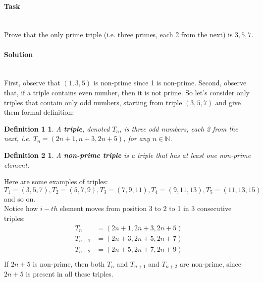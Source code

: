 \documentclass[11pt]{article}
\begin{document}
   \paragraph{Task}\mbox{} \\
   Prove that the only prime triple (i.e. three primes, each 2 from the next) is $3, 5, 7$.
   \paragraph{Solution}\mbox{} \\
   First, observe that $(1, 3, 5)$ is non-prime since 1 is non-prime.
   Second, observe that, if a triple contains even number, then it is not prime.
   So let's consider only triples that contain only odd numbers, starting from triple $(3, 5, 7)$ and give them formal definition:

   \newtheorem*{Definition1}{Definition 1}
   \begin{Definition1}
      A \textbf{triple}, denoted $T_{n}$, is three odd numbers, each 2 from the next, i.e. $T_{n} =(2n + 1, n + 3, 2n + 5)$, for any $n \in \mathbb{N}$.
   \end{Definition1}

   \newtheorem*{Definition2}{Definition 2}
   \begin{Definition2}
      A \textbf{non-prime triple} is a triple that has at least one non-prime element.
   \end{Definition2}

   Here are some examples of triples:
   $T_{1} = (3, 5, 7), T_{2} = (5, 7, 9), T_{3} = (7, 9, 11), T_{4} = (9, 11, 13), T_{5} = (11, 13, 15)$ and so on.\\
   Notice how $i-th$ element moves from position 3 to 2 to 1 in 3 consecutive triples:
   \begin{align*}
   T_{n} &= (2n + 1, 2n + 3, 2n + 5) \\
   T_{n + 1} &= (2n + 3, 2n + 5, 2n + 7) \\
   T_{n + 2} &= (2n + 5, 2n + 7, 2n + 9) \\
   \end{align*}
   If $2n + 5$ is non-prime, then both $T_{n}$ and $T_{n + 1}$ and $T_{n + 2}$ are non-prime, since $2n + 5$ is present in all these triples.
\end{document}
